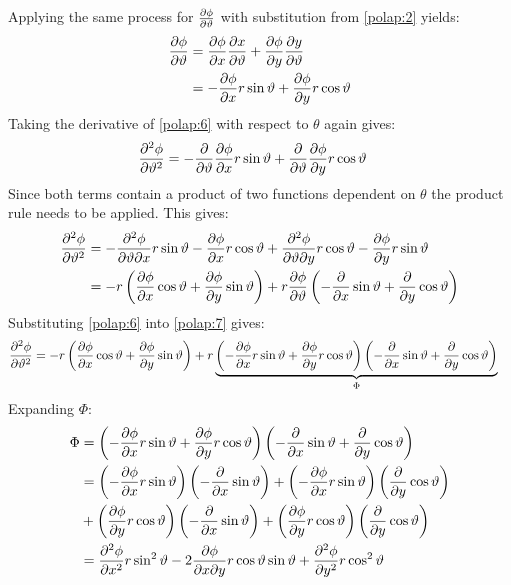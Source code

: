 Applying the same process for $\frac{\partial \phi}{\partial \vartheta}$ with substitution from \ref{polap:2} yields:
\begin{align}
	\notag\frac{\partial \phi}{\partial \vartheta}&=\frac{\partial \phi}{\partial x}\frac{\partial x}{\partial \vartheta}+\frac{\partial \phi}{\partial y}\frac{\partial y}{\partial \vartheta}\\
	\label{polap:6}&=-\frac{\partial \phi}{\partial x}r\sin\vartheta+\frac{\partial \phi}{\partial y}r\cos\vartheta
\end{align}
Taking the derivative of \ref{polap:6} with respect to $\theta$ again gives:
\begin{align}
	\notag\frac{\partial^2\phi}{\partial\vartheta^2}&=-\frac{\partial }{\partial \vartheta}\frac{\partial \phi}{\partial x}r\sin\vartheta+\frac{\partial }{\partial \vartheta}\frac{\partial \phi}{\partial y}r\cos\vartheta
\end{align}
Since both terms contain a product of two functions dependent on $\theta$ the product rule needs to be applied. This gives:
\begin{align}
	\notag\frac{\partial^2\phi}{\partial\vartheta^2}&=-\frac{\partial^2\phi}{\partial\vartheta\partial x}r\sin\vartheta-\frac{\partial \phi}{\partial x}r\cos\vartheta+\frac{\partial^2\phi}{\partial\vartheta\partial y}r\cos\vartheta-\frac{\partial \phi}{\partial y}r\sin\vartheta\\
	\label{polap:7}&=-r\left(\frac{\partial \phi}{\partial x}\cos\vartheta+\frac{\partial \phi}{\partial y}\sin\vartheta\right)+r\frac{\partial \phi}{\partial \vartheta}\left(-\frac{\partial }{\partial x}\sin\vartheta+\frac{\partial }{\partial y}\cos\vartheta\right)
\end{align}
Substituting \ref{polap:6} into \ref{polap:7} gives:
\begin{align}
	\label{polap:8}\frac{\partial^2\phi}{\partial\vartheta^2}&=-r\left(\frac{\partial \phi}{\partial x}\cos\vartheta+\frac{\partial \phi}{\partial y}\sin\vartheta\right)+r\underbrace{\left(-\frac{\partial \phi}{\partial x}r\sin\vartheta+\frac{\partial \phi}{\partial y}r\cos\vartheta\right)\left(-\frac{\partial }{\partial x}\sin\vartheta+\frac{\partial }{\partial y}\cos\vartheta\right)}_{\Phi}
\end{align}
Expanding $\Phi$:
\begin{align}
	\notag\Phi&=\left(-\frac{\partial \phi}{\partial x}r\sin\vartheta+\frac{\partial \phi}{\partial y}r\cos\vartheta\right)\left(-\frac{\partial }{\partial x}\sin\vartheta+\frac{\partial }{\partial y}\cos\vartheta\right)\\
	\notag&=\left(-\frac{\partial \phi}{\partial x}r\sin\vartheta\right)\left(-\frac{\partial }{\partial x}\sin\vartheta\right)+\left(-\frac{\partial \phi}{\partial x}r\sin\vartheta\right)\left(\frac{\partial }{\partial y}\cos\vartheta\right)\\
	\notag&+\left(\frac{\partial \phi}{\partial y}r\cos\vartheta\right)\left(-\frac{\partial }{\partial x}\sin\vartheta\right)+\left(\frac{\partial \phi}{\partial y}r\cos\vartheta\right)\left(\frac{\partial }{\partial y}\cos\vartheta\right)\\
	\notag&=\frac{\partial^2\phi}{\partial x^2}r\sin^2\vartheta-2\frac{\partial\phi}{\partial x\partial y}r\cos\vartheta\sin\vartheta+\frac{\partial^2\phi}{\partial y^2}r\cos^2\vartheta
\end{align}
